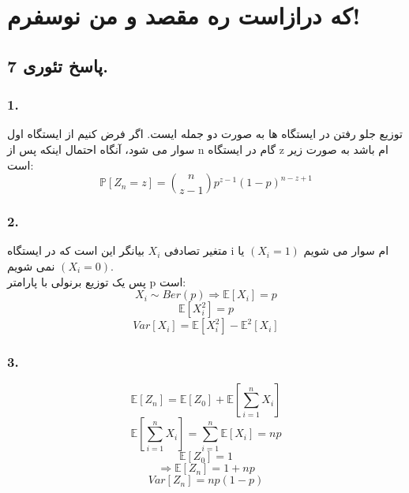 \documentclass[]{article}
\begin{document}
	\section{که درازاست ره مقصد و من نوسفرم!}
	\subsection{پاسخ تئوری 7.}
	\subsubsection{1.}
	توزیع جلو رفتن در ایستگاه ها به صورت دو جمله ایست. اگر فرض کنیم از ایستگاه اول سوار می شود، آنگاه احتمال اینکه پس از n گام در ایستگاه z ام باشد به صورت زیر است:
	\begin{equation}
		\nonumber
		\mathbb{P}[Z_n=z] = \binom{n}{z-1} p^{z-1} (1-p)^{n-z+1}
	\end{equation}
	\subsubsection{2.}
	متغیر تصادفی $X_i$ بیانگر این است که در ایستگاه i ام سوار می شویم $(X_i = 1)$ یا نمی شویم $(X_i = 0)$.\\ پس یک توزیع برنولی با پارامتر p است:
	\begin{equation}
		\nonumber
		X_i \sim Ber(p) \Rightarrow \mathbb{E}[X_i] = p
	\end{equation} 
	\begin{equation}
		\nonumber
		\mathbb{E}[X_i^2] = p
	\end{equation}
	\begin{equation}
		\nonumber
		Var[X_i] = \mathbb{E}[X_i^2] - \mathbb{E}^2[X_i]
	\end{equation}
	\subsubsection{3.}
	\begin{equation}
		\nonumber
		\mathbb{E}[Z_n] = \mathbb{E}[Z_0] + \mathbb{E}[\sum_{i=1}^{n}X_i]
	\end{equation}
	\begin{equation}
		\nonumber
		\mathbb{E}[\sum_{i=1}^{n}X_i] = \sum_{i=1}^{n}\mathbb{E}[X_i] = np
	\end{equation}
	\begin{equation}
		\nonumber
		\mathbb{E}[Z_0] = 1
	\end{equation}
	\begin{equation}
		\nonumber
		\Rightarrow \mathbb{E}[Z_n] = 1+np
	\end{equation}
	\begin{equation}
		\nonumber
		Var[Z_n] = np(1-p)
	\end{equation}
\end{document}
